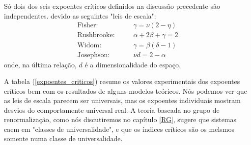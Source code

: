 Só dois dos seis expoentes críticos definidos na discussão precedente são independentes. devido as seguintes "leis de escala":
\begin{eqnarray}
\text{Fisher:}     ~&~&~~~ \gamma=\nu(2-\eta)\\
\text{Rushbrooke:} ~&~&~~~ \alpha+2\beta+\gamma=2\\
\text{Widom:}      ~&~&~~~ \gamma=\beta(\delta-1)\\
\text{Josephson:}  ~&~&~~~ \nu d=2-\alpha
\end{eqnarray}
onde, na última relação, $d$ é a dimensionalidade do espaço.

A tabela (\ref{expoentes_criticos}) resume os valores experimentais dos expoentes críticos bem com os resultados de alguns modelos teóricos. Nós podemos ver que as leis de escala parecem ser universais, mas os expoentes individuais mostram desvios do comportamente universal real. A teoria baseada no grupo de renormalização, como nós discutiremos no capítulo \ref{RG}, sugere que sistemas caem em "classes de universalidade", e que os índices críticos são os melsmos somente numa classe de universalidade.


